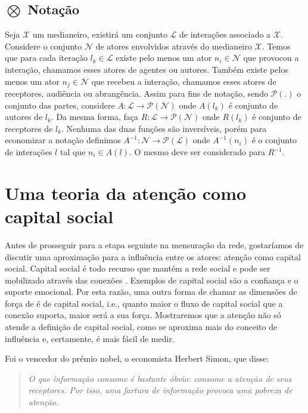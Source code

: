\subsection{$\bigotimes$ Notação}

Seja $\mathscr{X}$ um medianeiro, existirá um conjunto $\mathscr{L}$ de
interações associado a $\mathscr{X}$. Considere o conjunto $\mathscr{N}$ de
atores envolvidos através do medianeiro $\mathscr{X}$. Temos que para cada
iteração $l_k \in \mathscr{L}$ existe pelo menos um ator $n_i \in \mathscr{N}$
que provocou a interação, chamamos esses atores de agentes ou autores. Também
existe pelos menos um ator $n_j \in \mathscr{N}$ que recebeu a interação,
chamamos esses atores de receptores, audiência ou abrangência. Assim para fins de
notação, sendo $\mathscr{P}(.)$ o conjunto das partes, considere
$A:\mathscr{L}\to\mathscr{P}(\mathscr{N})$ onde $A(l_k)$ é conjunto de autores de
$l_k$. Da mesma forma, faça $R:\mathscr{L}\to\mathscr{P}(\mathscr{N})$ onde
$R(l_k)$ é conjunto de receptores de $l_k$. Nenhuma das duas funções são
inversíveis, porém para economizar a notação definimos
$A^{-1}:\mathscr{N}\to\mathscr{P}(\mathscr{L})$ onde $A^{-1}(n_i)$ é o conjunto
de interações $l$ tal que $n_i \in A(l)$. O mesmo deve ser considerado para
$R^{-1}$.

\section{Uma teoria da atenção como capital social}
\label{sec:teoria_atencao}

Antes de prosseguir para a etapa seguinte na mensuração da rede, gostaríamos de
discutir uma aproximação para a influência entre os atores: atenção como capital
social. Capital social é todo recurso que mantém a rede social
\citep{Coleman1988} e pode ser mobilizado através das conexões
\citep{Gyarmati2004}. Exemplos de capital social são a confiança e o suporte
emocional. Por esta razão, uma outra forma de chamar as dimensões de força de
\citeauthor{Granovetter1973} é de capital social, i.e., quanto maior o fluxo de
capital social que a conexão suporta, maior será a sua força. Mostraremos que a
atenção não só atende a definição de capital social, como se aproxima mais do
conceito de influência e, certamente, é mais fácil de medir.

Foi o vencedor do prémio nobel, o economista Herbert Simon, que disse:

\begin{quote}{\citep{Simon1996}}\emph{O que informação consome é bastante óbvio:
consome a atenção de seus receptores. Por isso, uma fartura de informação
provoca uma pobreza de atenção.}
\end{quote}

